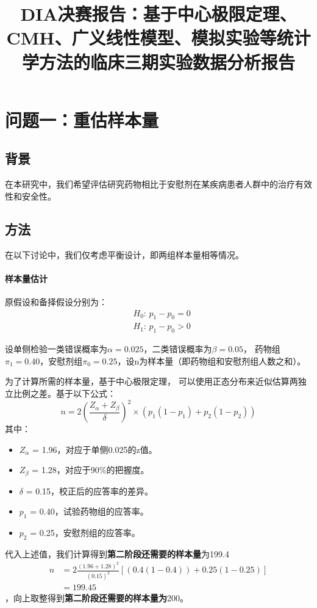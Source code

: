 \documentclass{article}
\title{DIA决赛报告：基于中心极限定理、CMH、广义线性模型、模拟实验等统计学方法的临床三期实验数据分析报告}
\author{}
\date{}
\begin{document}
	\maketitle
	\tableofcontents

\section{问题一：重估样本量}
\subsection{背景}
在本研究中，我们希望评估研究药物相比于安慰剂在某疾病患者人群中的治疗有效性和安全性。
\subsection{方法}
在以下讨论中，我们仅考虑平衡设计，即两组样本量相等情况。
\paragraph{样本量估计}
原假设和备择假设分别为：
\begin{align*}
    &H_0: \, p_1 - p_0 = 0\\
    &H_1: \,p_1 - p_0 > 0
\end{align*}

设单侧检验一类错误概率为$\alpha=0.025$，二类错误概率为$\beta=0.05$，
药物组$\pi_1=0.40$，安慰剂组$\pi_0=0.25$，设n为样本量（即药物组和安慰剂组人数之和）。

为了计算所需的样本量，基于中心极限定理，
可以使用正态分布来近似估算两独立比例之差。基于以下公式：
\[n = 2 \left(\frac{Z_{\alpha} + Z_{\beta}}{\delta}\right)^2 
	\times \left(p_1(1-p_1) + p_2(1-p_2)\right)
\]
其中：
\begin{itemize}
    \item \(Z_{\alpha}\) = 1.96，对应于单侧0.025的z值。
    \item \(Z_{\beta}\) = 1.28，对应于90\%的把握度。
    \item \(\delta\) = 0.15，校正后的应答率的差异。
    \item \(p_1\) = 0.40，试验药物组的应答率。
    \item \(p_2\) = 0.25，安慰剂组的应答率。
\end{itemize}
代入上述值，我们计算得到\textbf{第二阶段还需要的样本量}为199.4
\begin{align*}
    n &= 2\frac{(1.96+1.28)^2}{(0.15)^2}\left[ (0.4(1-0.4)) + 0.25(1-0.25) \right]\\
      &= 199.45
\end{align*}
，向上取整得到\textbf{第二阶段还需要的样本量为}200。
\end{document}
